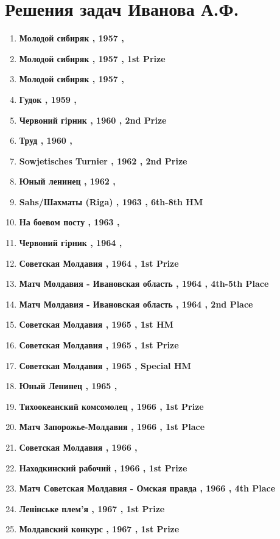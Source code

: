 \section{Решения задач Иванова А.Ф.}

\begin{enumerate}
\item  \textbf{ Молодой сибиряк , 1957 , }
\item  \textbf{ Молодой сибиряк , 1957 , 1st Prize }
\item  \textbf{ Молодой сибиряк , 1957 , }
\item  \textbf{ Гудок , 1959 , }
\item  \textbf{ Червоний гiрник , 1960 , 2nd Prize }
\item  \textbf{ Труд , 1960 , }
\item  \textbf{ Sowjetisches Turnier , 1962 , 2nd Prize }
\item  \textbf{ Юный ленинец , 1962 , }
\item  \textbf{ Sahs/Шахматы (Riga) , 1963 , 6th-8th HM }
\item  \textbf{ На боевом посту , 1963 , }
\item  \textbf{ Червоний гiрник , 1964 , }
\item  \textbf{ Советская Молдавия , 1964 , 1st Prize }
\item  \textbf{ Матч Молдавия - Ивановская область , 1964 , 4th-5th Place }
\item  \textbf{ Матч Молдавия - Ивановская область , 1964 , 2nd Place }
\item  \textbf{ Советская Молдавия , 1965 , 1st HM }
\item  \textbf{ Советская Молдавия , 1965 , 1st Prize }
\item  \textbf{ Советская Молдавия , 1965 , Special HM }
\item  \textbf{ Юный Ленинец , 1965 , }
\item  \textbf{ Тихоокеанский комсомолец , 1966 , 1st Prize }
\item  \textbf{ Матч Запорожье-Молдавия , 1966 , 1st Place }
\item  \textbf{ Советская Молдавия , 1966 , }
\item  \textbf{ Находкинский рабочий , 1966 , 1st Prize }
\item  \textbf{ Матч Советская Молдавия - Омская правда , 1966 , 4th Place }
\item  \textbf{ Ленінське плем'я , 1967 , 1st Prize }
\item  \textbf{ Молдавский конкурс , 1967 , 1st Prize }

\end{enumerate}
